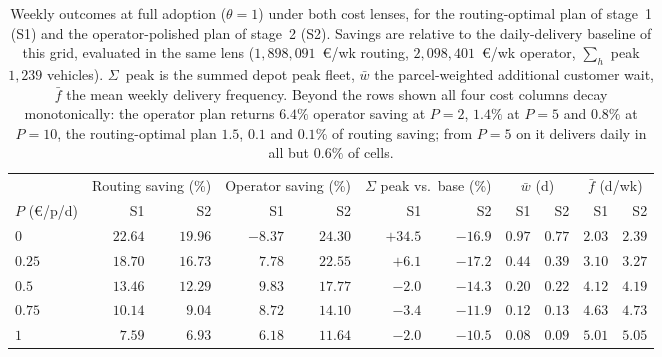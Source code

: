 \begin{table}[t]
  \centering
  \caption[Two cost lenses and two plans at full adoption]%
  {Weekly outcomes at full adoption ($\theta = 1$) under both cost lenses, for the
   routing-optimal plan of stage~1 (S1) and the operator-polished plan of stage~2
   (S2). Savings are relative to the daily-delivery baseline of this grid,
   evaluated in the same lens ($1{,}898{,}091$~\euro/wk routing, $2{,}098{,}401$~\euro/wk
   operator, $\sum_h$ peak $1{,}239$ vehicles). $\Sigma$~peak is the summed depot peak
   fleet, $\bar{w}$ the parcel-weighted additional customer wait, $\bar{f}$ the mean
   weekly delivery frequency. Beyond the rows shown all four cost columns decay
   monotonically: the operator plan returns $6.4\%$ operator saving at $P = 2$,
   $1.4\%$ at $P = 5$ and $0.8\%$ at $P = 10$, the routing-optimal plan $1.5$,
   $0.1$ and $0.1\%$ of routing saving; from $P = 5$ on it delivers daily in all
   but $0.6\%$ of cells.}
  \label{tab:two_lens}
  \small
  \setlength{\tabcolsep}{4.5pt}
  \begin{tabular}{l rr rr rr rr rr}
    \toprule
    & \multicolumn{2}{c}{Routing saving (\%)}
    & \multicolumn{2}{c}{Operator saving (\%)}
    & \multicolumn{2}{c}{$\Sigma$ peak vs.\ base (\%)}
    & \multicolumn{2}{c}{$\bar{w}$ (d)}
    & \multicolumn{2}{c}{$\bar{f}$ (d/wk)} \\
    \cmidrule(lr){2-3}\cmidrule(lr){4-5}\cmidrule(lr){6-7}\cmidrule(lr){8-9}\cmidrule(lr){10-11}
    $P$ (\euro/p/d) & S1 & S2 & S1 & S2 & S1 & S2 & S1 & S2 & S1 & S2 \\
    \midrule
    $0$    & $22.64$ & $19.96$ & $-8.37$ & $24.30$ & $+34.5$ & $-16.9$ & $0.97$ & $0.77$ & $2.03$ & $2.39$ \\
    $0.25$ & $18.70$ & $16.73$ & $7.78$  & $22.55$ & $+6.1$  & $-17.2$ & $0.44$ & $0.39$ & $3.10$ & $3.27$ \\
    $0.5$  & $13.46$ & $12.29$ & $9.83$  & $17.77$ & $-2.0$  & $-14.3$ & $0.20$ & $0.22$ & $4.12$ & $4.19$ \\
    $0.75$ & $10.14$ & $9.04$  & $8.72$  & $14.10$ & $-3.4$  & $-11.9$ & $0.12$ & $0.13$ & $4.63$ & $4.73$ \\
    $1$    & $7.59$  & $6.93$  & $6.18$  & $11.64$ & $-2.0$  & $-10.5$ & $0.08$ & $0.09$ & $5.01$ & $5.05$ \\
    \bottomrule
  \end{tabular}
\end{table}
